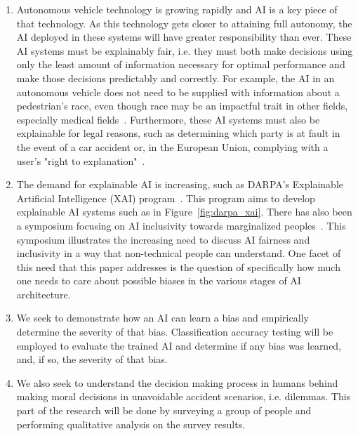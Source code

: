 \documentclass{report}
\begin{document}
\begin{enumerate}
    \item Autonomous vehicle technology is growing rapidly and AI is a key piece of that technology.
    As this technology gets closer to attaining full autonomy, the AI deployed in these systems will
    have greater responsibility than ever. These AI systems must be explainably fair, i.e. they must
    both make decisions using only the least amount of information necessary for optimal performance
    and make those decisions predictably and correctly. For example, the AI in an autonomous vehicle
    does not need to be supplied with information about a pedestrian's race, even though race may be
    an impactful trait in other fields, especially medical fields~\cite{sickeCellDisease}.
    Furthermore, these AI systems must also be explainable for legal reasons, such as determining
    which party is at fault in the event of a car accident or, in the European Union, complying with
    a user's "right to explanation"~\cite{goodman2017european}.
    
    \item The demand for explainable AI is increasing, such as DARPA's Explainable Artificial
    Intelligence (XAI) program~\cite{gunning2016explainable}. This program aims to develop
    explainable AI systems such as in Figure~\ref{fig:darpa_xai}. There has also been a symposium
    focusing on AI inclusivity towards marginalized
    peoples~\cite{berkmanKleinCenterAI2017,aiAndInclusionSymposium}. This symposium illustrates the
    increasing need to discuss AI fairness and inclusivity in a way that non-technical people can
    understand. One facet of this need that this paper addresses is the question of specifically how
    much one needs to care about possible biases in the various stages of AI architecture.
    
    \item We seek to demonstrate how an AI can learn a bias and empirically determine the severity
    of that bias. Classification accuracy testing will be employed to evaluate the trained AI and
    determine if any bias was learned, and, if so, the severity of that bias.

    \item We also seek to understand the decision making process in humans behind making moral
    decisions in unavoidable accident scenarios, i.e. dilemmas. This part of the research will be
    done by surveying a group of people and performing qualitative analysis on the survey results.
\end{enumerate}
\end{document}
